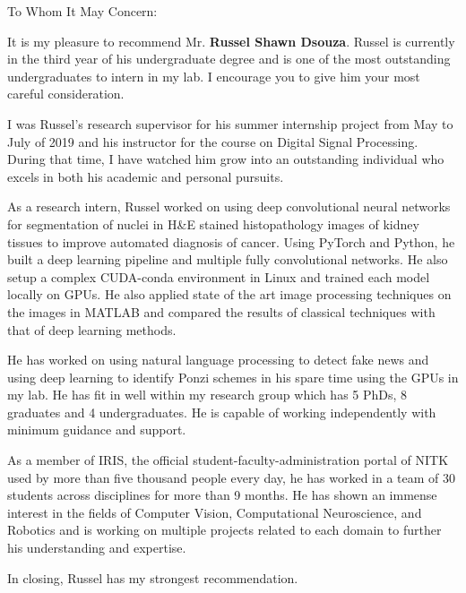 \documentclass[12pt]{article}
\begin{document}
\noindent
To Whom It May Concern:

\bigskip
\noindent
It is my pleasure to recommend Mr. \textbf{Russel Shawn Dsouza}. Russel is currently in the third year of his undergraduate degree and is one of the most outstanding undergraduates to intern in my lab. I encourage you to give him your most careful consideration.

\medskip
\noindent
I was Russel's research supervisor for his summer internship project from May to July of 2019 and his instructor for the course on Digital Signal Processing.
During that time, I have watched him grow into an outstanding individual who excels in both his academic and personal pursuits.

\medskip
\noindent
As a research intern, Russel worked on using deep convolutional neural networks for segmentation of nuclei in H\&E stained histopathology images of kidney tissues to improve automated diagnosis of cancer.
Using PyTorch and Python, he built a deep learning pipeline and multiple fully convolutional networks. He also setup a complex CUDA-conda environment in Linux and trained each model locally on GPUs.
He also applied state of the art image processing techniques on the images in MATLAB and compared the results of classical techniques with that of deep learning methods.

\medskip
\noindent
He has worked on using natural language processing to detect fake news and using deep learning to identify Ponzi schemes in his spare time using the GPUs in my lab.
He has fit in well within my research group which has 5 PhDs, 8 graduates and 4 undergraduates.
He is capable of working independently with minimum guidance and support. 

\medskip
\noindent
As a member of IRIS, the official student-faculty-administration portal of NITK used by more than five thousand people every day, he has worked in a team of 30 students across disciplines for more than 9 months.
He has shown an immense interest in the fields of Computer Vision, Computational Neuroscience, and Robotics and is working on multiple projects related to each domain to further his understanding and expertise.

\medskip
\noindent
In closing, Russel has my strongest recommendation.
\end{document}

